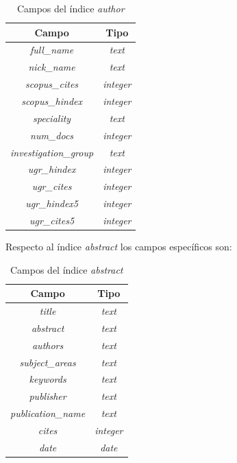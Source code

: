 \begin{table} [h!]
	\centering
	\begin{tabular}{| c | c |}
		\hline
		\textbf{Campo}                & \textbf{Tipo}    \\ \hline
		\textit{full\_name}           & \textit{text}    \\
		\textit{nick\_name}           & \textit{text}    \\
		\textit{scopus\_cites}        & \textit{integer} \\
		\textit{scopus\_hindex}       & \textit{integer} \\
		\textit{speciality}           & \textit{text}    \\
		\textit{num\_docs}            & \textit{integer} \\
		\textit{investigation\_group} & \textit{text}    \\
		\textit{ugr\_hindex}          & \textit{integer} \\
		\textit{ugr\_cites}           & \textit{integer} \\
		\textit{ugr\_hindex5}         & \textit{integer} \\
		\textit{ugr\_cites5}          & \textit{integer} \\ \hline
	\end{tabular}
	\caption{Campos del índice \textit{author}}
\end{table}

\newpage
Respecto al índice \textit{abstract} los campos específicos son:

\begin{table} [h!]
	\centering
	\begin{tabular}{| c | c |}
		\hline
		\textbf{Campo}             & \textbf{Tipo}    \\ \hline
		\textit{title}             & \textit{text}    \\
		\textit{abstract}          & \textit{text}    \\
		\textit{authors}           & \textit{text}    \\
		\textit{subject\_areas}    & \textit{text}    \\
		\textit{keywords}          & \textit{text}    \\
		\textit{publisher}         & \textit{text}    \\
		\textit{publication\_name} & \textit{text}    \\
		\textit{cites}             & \textit{integer} \\
		\textit{date}              & \textit{date}    \\ \hline
	\end{tabular}
	\caption{Campos del índice \textit{abstract}}
\end{table}



